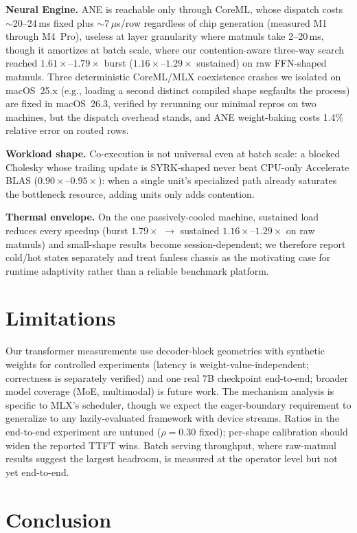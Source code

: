 \documentclass{article}
\newcommand{\x}[1]{$#1\times$}
\begin{document}
\textbf{Neural Engine.} ANE is reachable only through CoreML, whose
dispatch costs $\sim$20--24\,ms fixed plus $\sim$7\,$\mu$s/row regardless
of chip generation (measured M1 through M4~Pro), useless at layer
granularity where matmuls take 2--20\,ms, though it amortizes at batch
scale, where our contention-aware three-way search reached
\x{1.61}--\x{1.79} burst (\x{1.16}--\x{1.29} sustained) on raw FFN-shaped
matmuls. Three deterministic CoreML/MLX coexistence crashes we isolated on
macOS~25.x (e.g., loading a second distinct compiled shape segfaults the
process) are fixed in macOS~26.3, verified by rerunning our minimal
repros on two machines, but the dispatch overhead stands, and ANE
weight-baking costs 1.4\% relative error on routed rows.

\textbf{Workload shape.} Co-execution is not universal even at batch scale:
a blocked Cholesky whose trailing update is SYRK-shaped never beat CPU-only
Accelerate BLAS (\x{0.90}--\x{0.95}): when a single unit's specialized
path already saturates the bottleneck resource, adding units only adds
contention.

\textbf{Thermal envelope.} On the one passively-cooled machine, sustained
load reduces every speedup (burst \x{1.79} $\rightarrow$ sustained
\x{1.16}--\x{1.29} on raw matmuls) and small-shape results become
session-dependent; we therefore report cold/hot states separately and treat
fanless chassis as the motivating case for runtime adaptivity rather than a
reliable benchmark platform.

\section{Limitations}

Our transformer measurements use decoder-block geometries with synthetic
weights for controlled experiments (latency is weight-value-independent;
correctness is separately verified) and one real 7B checkpoint end-to-end;
broader model coverage (MoE, multimodal) is future work. The mechanism
analysis is specific to MLX's scheduler, though we expect the
eager-boundary requirement to generalize to any lazily-evaluated framework
with device streams. Ratios in the end-to-end experiment are untuned
($\rho{=}0.30$ fixed); per-shape calibration should widen the reported TTFT
wins. Batch serving throughput, where raw-matmul results suggest the
largest headroom, is measured at the operator level but not yet
end-to-end.

\section{Conclusion}
\end{document}
